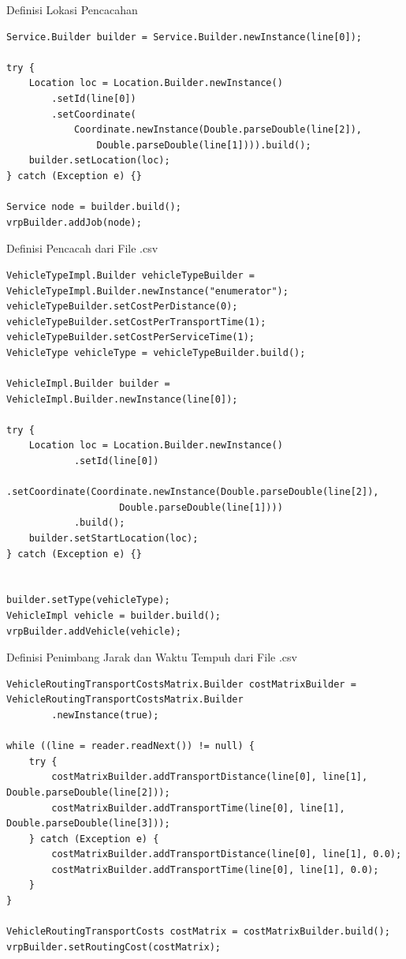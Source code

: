 \begin{listing}[!]
	\caption{Definisi Lokasi Pencacahan}
	\label{lst:jsprit_define_locations}
	\begin{verbatim}
Service.Builder builder = Service.Builder.newInstance(line[0]);

try {
    Location loc = Location.Builder.newInstance()
        .setId(line[0])
        .setCoordinate(
            Coordinate.newInstance(Double.parseDouble(line[2]), 
                Double.parseDouble(line[1]))).build();
    builder.setLocation(loc);
} catch (Exception e) {}

Service node = builder.build();
vrpBuilder.addJob(node);
	\end{verbatim}
\end{listing}


\begin{listing}[!]
	\caption{Definisi Pencacah dari File .csv}
	\label{lst:jsprit_define_enumerators}
	\begin{verbatim}
VehicleTypeImpl.Builder vehicleTypeBuilder = VehicleTypeImpl.Builder.newInstance("enumerator");
vehicleTypeBuilder.setCostPerDistance(0);
vehicleTypeBuilder.setCostPerTransportTime(1);
vehicleTypeBuilder.setCostPerServiceTime(1);
VehicleType vehicleType = vehicleTypeBuilder.build();

VehicleImpl.Builder builder = VehicleImpl.Builder.newInstance(line[0]);

try {
    Location loc = Location.Builder.newInstance()
            .setId(line[0])
            .setCoordinate(Coordinate.newInstance(Double.parseDouble(line[2]),
                    Double.parseDouble(line[1])))
            .build();
    builder.setStartLocation(loc);
} catch (Exception e) {}


builder.setType(vehicleType);
VehicleImpl vehicle = builder.build();
vrpBuilder.addVehicle(vehicle);
	\end{verbatim}
\end{listing}


\begin{listing}[!]
	\caption{Definisi Penimbang Jarak dan Waktu Tempuh dari File .csv}
	\label{lst:jsprit_define_route_weights}
	\begin{verbatim}
VehicleRoutingTransportCostsMatrix.Builder costMatrixBuilder = VehicleRoutingTransportCostsMatrix.Builder
        .newInstance(true);

while ((line = reader.readNext()) != null) {
    try {
        costMatrixBuilder.addTransportDistance(line[0], line[1], Double.parseDouble(line[2]));
        costMatrixBuilder.addTransportTime(line[0], line[1], Double.parseDouble(line[3]));
    } catch (Exception e) {
        costMatrixBuilder.addTransportDistance(line[0], line[1], 0.0);
        costMatrixBuilder.addTransportTime(line[0], line[1], 0.0);
    }
}

VehicleRoutingTransportCosts costMatrix = costMatrixBuilder.build();
vrpBuilder.setRoutingCost(costMatrix);
	\end{verbatim}
\end{listing}


